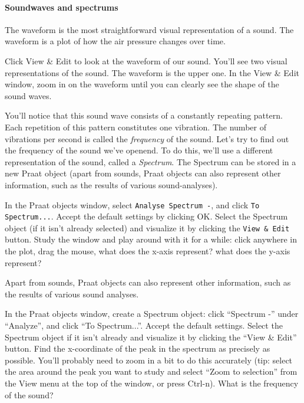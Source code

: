 \documentclass[a4paper, 9pt]{article}
\begin{document}
\paragraph{Soundwaves and spectrums}\label{soundwaves-and-spectrums}

The waveform is the most straightforward visual representation of a
sound. The waveform is a plot of how the air pressure changes over time.

\begin{exercise}
\action Click View \& Edit to look at the waveform of our sound.
You'll see two visual representations of the sound. The waveform is the
upper one.
\action In the View \& Edit window, zoom in on the waveform until you can clearly see the shape of the sound waves.
\end{exercise}

You'll notice that this sound wave consists of a constantly repeating
pattern. Each repetition of this pattern constitutes one vibration. The
number of vibrations per second is called the \emph{frequency} of the
sound.
Let's try to find out the frequency of the sound we've openend. To do
this, we'll use a different representation of the sound, called a
\emph{Spectrum}. The Spectrum can be stored in a new Praat object (apart
from sounds, Praat objects can also represent other information, such as
the results of various sound-analyses).

\begin{exercise}
\action In the Praat objects window, select \texttt{Analyse Spectrum -}, and click \texttt{To Spectrum...}. Accept the default settings by clicking OK.
\action Select the Spectrum object (if it isn't already selected) and visualize it by clicking the \texttt{View \& Edit} button.
\action Study the window and play around with it for a while: click anywhere in the plot, drag the mouse, what does the x-axis represent? what does the y-axis represent?
\end{exercise}

Apart from sounds, Praat objects can also represent other information,
such as the results of various sound analyses.

\begin{exercise}
\action In the Praat objects window, create a Spectrum object: click ``Spectrum -'' under ``Analyze'', and click ``To Spectrum...''. Accept the default settings.
\action Select the Spectrum object if it isn't already and visualize it by clicking the ``View \& Edit'' button.
Find the x-coordinate of the peak in the spectrum as precisely as possible. You'll probably need to zoom in a bit to do this accurately (tip: select the area around the peak you want to study and select ``Zoom to selection'' from the View menu at the top of the window, or press Ctrl-n). What is the frequency of the sound? 
\end{exercise}
\end{document}
